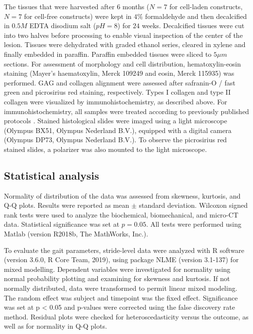 \documentclass[twocolumn, empirical, authordate, issue]{jote-new-article}
\begin{document}
The tissues that were harvested after $6$ months ($N=7$ for cell-laden constructs, $N=7$ for cell-free constructs) were kept in $4\%$ formaldehyde and then decalcified in $0.5M$ EDTA disodium salt ($pH = 8$) for $24$ weeks. Decalcified tissues were cut into two halves before processing to enable visual inspection of the center of the lesion. Tissues were dehydrated with graded ethanol series, cleared in xylene and finally embedded in paraffin. Paraffin embedded tissues were sliced to $5 \mu m$ sections. For assessment of morphology and cell distribution, hematoxylin-eosin staining (Mayer's haematoxylin, Merck 109249 and eosin, Merck 115935) was performed. GAG and collagen alignment were assessed after safranin-O / fast green and picrosirius red staining, respectively. Types I collagen and type II collagen were visualized by immunohistochemistry, as described above. For immunohistochemistry, all samples were treated according to previously published protocols \parencite{Levato2017}. Stained histological slides were imaged using a light microscope (Olympus BX51, Olympus Nederland B.V.), equipped with a digital camera (Olympus DP73, Olympus Nederland B.V.). To observe the picrosirius red stained slides, a polarizer was also mounted to the light microscope.

\subsection{Statistical analysis} 

Normality of distribution of the data was assessed from skewness, kurtosis, and Q-Q plots. Results were reported as mean $\pm$ standard deviation. Wilcoxon signed rank tests were used to analyze the biochemical, biomechanical, and micro-CT data. Statistical significance was set at $p = 0.05$. All tests were performed using Matlab (version R2018b, The MathWorks, Inc.).

To evaluate the gait parameters, stride-level data were analyzed with R software (version 3.6.0, R Core Team, 2019), using package NLME (version 3.1-137) for mixed modelling. Dependent variables were investigated for normality using normal probability plotting and examining for skewness and kurtosis. If not normally distributed, data were transformed to permit linear mixed modeling. The random effect was subject and timepoint was the fixed effect. Significance was set at p \textless{}
0.05 and p-values were corrected using the false discovery rate method. Residual plots were checked for heteroscedasticity versus the outcome, as well as for normality in Q-Q plots.
\end{document}
